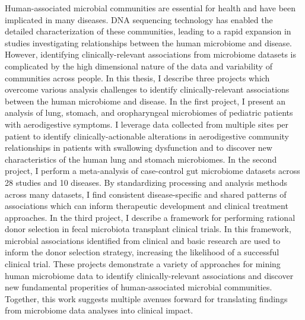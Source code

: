 
Human-associated microbial communities are essential for health and have been implicated in many diseases.
DNA sequencing technology has enabled the detailed characterization of these communities, leading to a rapid expansion in studies investigating relationships between the human microbiome and disease.
However, identifying clinically-relevant associations from microbiome datasets is complicated by the high dimensional nature of the data and variability of communities across people.
In this thesis, I describe three projects which overcome various analysis challenges to identify clinically-relevant associations between the human microbiome and disease.
In the first project, I present an analysis of lung, stomach, and oropharyngeal microbiomes of pediatric patients with aerodigestive symptoms.
I leverage data collected from multiple sites per patient to identify  clinically-actionable alterations in aerodigestive community relationships in patients with swallowing dysfunction and to discover new characteristics of the human lung and stomach microbiomes.
In the second project, I perform a meta-analysis of case-control gut microbiome datasets across 28 studies and 10 diseases.
By standardizing processing and analysis methods across many datasets, I find consistent disease-specific and shared patterns of associations which can inform therapeutic development and clinical treatment approaches.
In the third project, I describe a framework for performing rational donor selection in fecal microbiota transplant clinical trials.
In this framework, microbial associations identified from clinical and basic research are used to inform the donor selection strategy, increasing the likelihood of a successful clinical trial.
These projects demonstrate a variety of approaches for mining human microbiome data to identify clinically-relevant associations and discover new fundamental properities of human-associated microbial communities.
Together, this work suggests multiple avenues forward for translating findings from microbiome data analyses into clinical impact.
